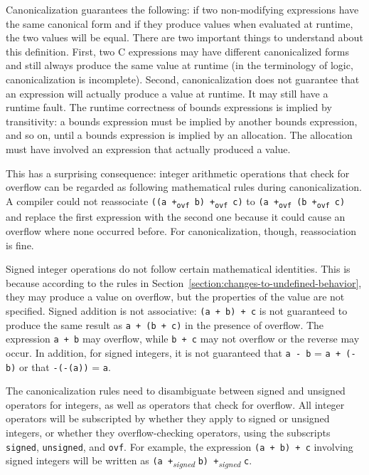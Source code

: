 Canonicalization guarantees the following: if two non-modifying
expressions have the same canonical form and if they produce values when
evaluated at runtime, the two values will be equal. There are two
important things to understand about this definition. First, two C
expressions may have different canonicalized forms and still always
produce the same value at runtime (in the terminology of logic,
canonicalization is incomplete). Second, canonicalization does not
guarantee that an expression will actually produce a value at runtime.
It may still have a runtime fault. The runtime correctness of bounds
expressions is implied by transitivity: a bounds expression must be
implied by another bounds expression, and so on, until a bounds
expression is implied by an allocation. The allocation must have
involved an expression that actually produced a value.

This has a surprising consequence: integer arithmetic operations that
check for overflow can be regarded as following mathematical rules
during canonicalization. A compiler could not reassociate \texttt{((a
+\textsubscript{ovf} b) +\textsubscript{ovf} c)} to \texttt{(a
+\textsubscript{ovf} (b +\textsubscript{ovf} c)} and replace the first
expression with the second one because it could cause an overflow where
none occurred before. For canonicalization, though, reassociation is
fine.

Signed integer operations do not follow certain mathematical identities.
This is because according to the rules in 
Section~\ref{section:changes-to-undefined-behavior}, they may produce
a value on overflow, but the properties of the value are not specified.
Signed addition is not associative: \texttt{(a + b) + c} is not
guaranteed to produce the same result as \texttt{a + (b + c)} in the
presence of overflow. The expression \texttt{a + b} may overflow, while
\texttt{b + c} may not overflow or the reverse may occur. In addition,
for signed integers, it is not guaranteed that \texttt{a - b} =
\texttt{a + (-b)} or that \texttt{-(-(a))} = \texttt{a}.

The canonicalization rules need to disambiguate between signed and
unsigned operators for integers, as well as operators that check for
overflow. All integer operators will be subscripted by whether they
apply to signed or unsigned integers, or whether they overflow-checking
operators, using the subscripts \texttt{signed}, \texttt{unsigned}, and
\texttt{ovf}. For example, the expression \texttt{(a + b) + c} involving
signed integers will be written as \texttt{(a
+}\emph{\textsubscript{signed}} \texttt{b)
+}\emph{\textsubscript{signed}} \texttt{c}.

